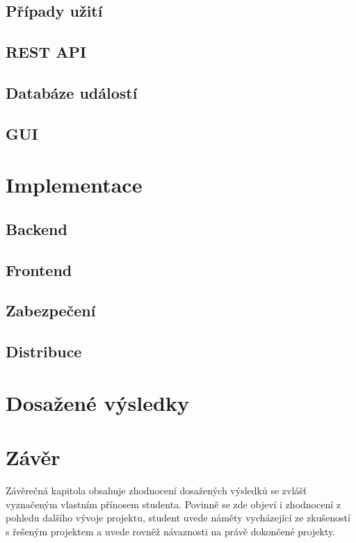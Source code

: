 \section{Případy užití}
\section{REST API}
\label{restapi}
\section{Databáze událostí}
\section{GUI}

\chapter{Implementace}
\section{Backend}
\section{Frontend}
\section{Zabezpečení}
\section{Distribuce}

\chapter{Dosažené výsledky}

\chapter{Závěr}
Závěrečná kapitola obsahuje zhodnocení dosažených výsledků se zvlášť vyznačeným vlastním přínosem studenta. Povinně se zde objeví i zhodnocení z pohledu dalšího vývoje projektu, student uvede náměty vycházející ze zkušeností s řešeným projektem a uvede rovněž návaznosti na právě dokončené projekty.


